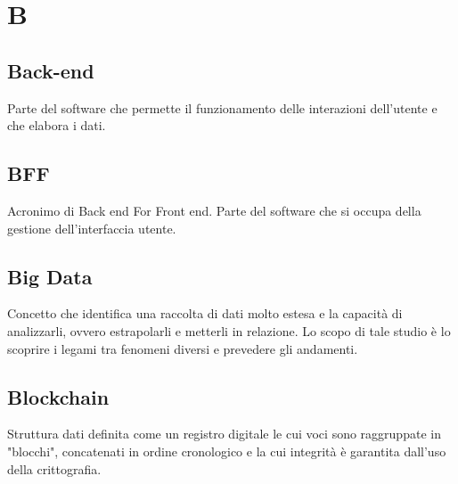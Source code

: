 \section*{B}
\markright{}
\subsection*{Back-end}
Parte del software che permette il funzionamento delle interazioni dell'utente e che elabora i dati.
\subsection*{BFF}
Acronimo di Back end For Front end. Parte del software che si occupa della gestione dell'interfaccia utente.
\subsection*{Big Data}
Concetto che identifica una raccolta di dati molto estesa e la capacità di analizzarli, ovvero estrapolarli e metterli in relazione. Lo scopo di tale studio è lo scoprire i legami tra fenomeni diversi e prevedere gli andamenti.
\subsection*{Blockchain}
Struttura dati definita come un registro digitale le cui voci sono raggruppate in "blocchi", concatenati in ordine cronologico e la cui integrità è garantita dall'uso della crittografia.